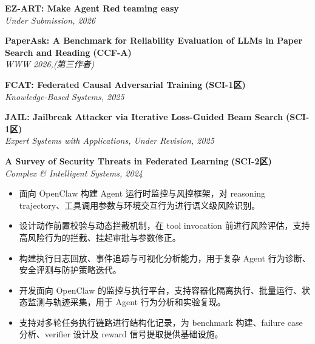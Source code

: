 \vspace{0.3em}
\textbf{EZ-ART: Make Agent Red teaming easy} \\
\textit{Under Submission, 2026}

\vspace{0.3em}
\textbf{PaperAsk: A Benchmark for Reliability Evaluation of LLMs in Paper Search and Reading} \hfill \textbf{(CCF-A)} \\
\textit{WWW 2026,\quad (第三作者)}

\vspace{0.3em}
\textbf{FCAT: Federated Causal Adversarial Training} \hfill \textbf{(SCI-1区)}\\
\textit{Knowledge-Based Systems, 2025}

\vspace{0.3em}
\textbf{JAIL: Jailbreak Attacker via Iterative Loss-Guided Beam Search} \hfill \textbf{(SCI-1区)} \\
\textit{Expert Systems with Applications, Under Revision, 2025}


\vspace{0.3em}
\textbf{A Survey of Security Threats in Federated Learning} \hfill \textbf{(SCI-2区)} \\
\textit{Complex \& Intelligent Systems, 2024}







\begin{itemize}[leftmargin=1.5em]
  \item 面向 OpenClaw 构建 Agent 运行时监控与风控框架，对 reasoning trajectory、工具调用参数与环境交互行为进行语义级风险识别。
  \item 设计动作前置校验与动态拦截机制，在 tool invocation 前进行风险评估，支持高风险行为的拦截、挂起审批与参数修正。
  \item 构建执行日志回放、事件追踪与可视化分析能力，用于复杂 Agent 行为诊断、安全评测与防护策略迭代。
\end{itemize}

\begin{itemize}[leftmargin=1.5em]
  \item 开发面向 OpenClaw 的监控与执行平台，支持容器化隔离执行、批量运行、状态监测与轨迹采集，用于 Agent 行为分析和实验复现。
  \item 支持对多轮任务执行链路进行结构化记录，为 benchmark 构建、failure case 分析、verifier 设计及 reward 信号提取提供基础设施。
\end{itemize}

